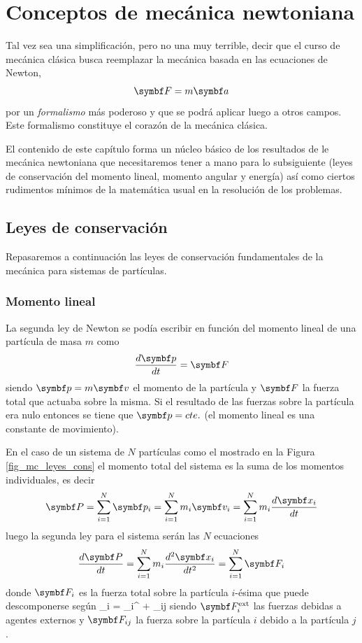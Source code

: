 \documentclass[10pt,oneside]{CBFT_book}
\begin{document}
\chapter{Conceptos de mecánica newtoniana}

Tal vez sea una simplificación, pero no una muy terrible, decir que el curso de mecánica clásica
busca reemplazar la mecánica basada en las ecuaciones de Newton,
\[
	\vb{F} = m \vb{a} 
\]
por un \emph{formalismo} más poderoso y que se podrá aplicar luego a otros campos.
Este formalismo constituye el corazón de la mecánica clásica.

El contenido de este capítulo forma un núcleo básico de los resultados de le mecánica newtoniana que necesitaremos 
tener a mano para lo subsiguiente (leyes de conservación del momento lineal, momento angular y energía) así como 
ciertos rudimentos mínimos de la matemática usual en la resolución de los problemas.

\section{Leyes de conservación}

Repasaremos a continuación las leyes de conservación fundamentales de la mecánica para sistemas de partículas.

\subsection{Momento lineal}

La segunda ley de Newton se podía escribir en función del momento lineal de una partícula de masa $ m $ como
\[
	\dtot{\vb{p}}{t} = \vb{F}
\]
siendo $ \vb{p} = m\vb{v} $ el momento de la partícula y $ \vb{F} $ la fuerza total que actuaba sobre la misma.
Si el resultado de las fuerzas sobre la partícula era nulo entonces se tiene que $ \vb{p} = cte. $ (el momento lineal 
es una constante de movimiento).

En el caso de un sistema de $N$ partículas como el mostrado en la Figura \ref{fig_mc_leyes_cons} el momento total del 
sistema es la suma de los momentos individuales, es decir
\[
	\vb{P} = \Sum{i=1}{N} \vb{p}_i = \Sum{i=1}{N} m_i \vb{v}_i = \Sum{i=1}{N} m_i \dtot{\vb{x}_i}{t}
\]
luego la segunda ley para el sistema serán las $ N $ ecuaciones
\[
	\dtot{\vb{P}}{t} = \Sum{i=1}{N} m_i \dtot[2]{\vb{x}_i}{t} = \Sum{i=1}{N} \vb{F}_i
\]
donde $ \vb{F}_i$ es la fuerza total sobre la partícula $i$-ésima que puede descomponerse según
\be
	_i = _i^ +  _{ij}
	\label{descomp_fuerzas}
\ee
siendo $ \vb{F}_i^\text{ext} $ las fuerzas debidas a agentes externos y $\vb{F}_{ij}$ la fuerza sobre la partícula $i$ 
debido a la partícula $j$.
\end{document}
